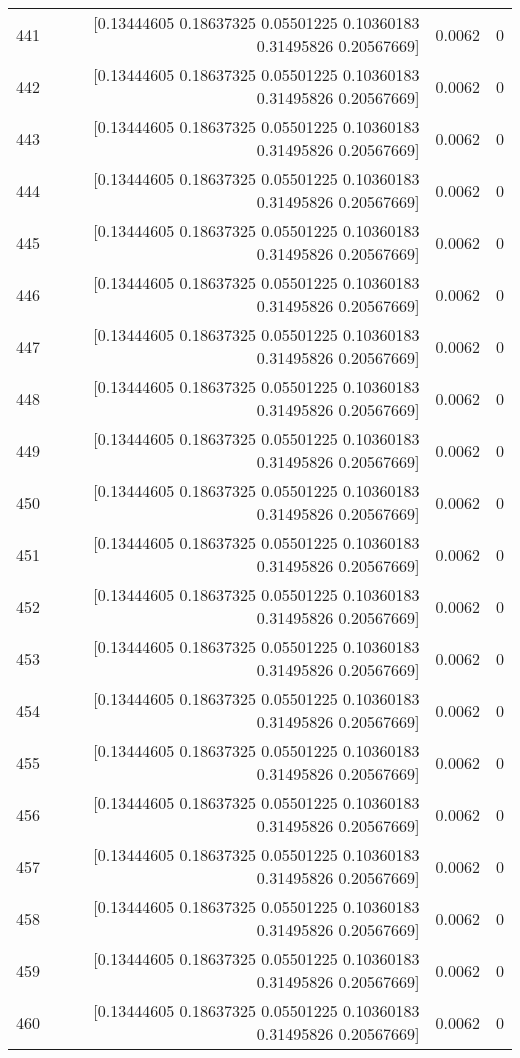 \begin{longtable}{lrrr}
441 & [0.13444605 0.18637325 0.05501225 0.10360183 0.31495826 0.20567669] & 0.0062 & 0 \\
442 & [0.13444605 0.18637325 0.05501225 0.10360183 0.31495826 0.20567669] & 0.0062 & 0 \\
443 & [0.13444605 0.18637325 0.05501225 0.10360183 0.31495826 0.20567669] & 0.0062 & 0 \\
444 & [0.13444605 0.18637325 0.05501225 0.10360183 0.31495826 0.20567669] & 0.0062 & 0 \\
445 & [0.13444605 0.18637325 0.05501225 0.10360183 0.31495826 0.20567669] & 0.0062 & 0 \\
446 & [0.13444605 0.18637325 0.05501225 0.10360183 0.31495826 0.20567669] & 0.0062 & 0 \\
447 & [0.13444605 0.18637325 0.05501225 0.10360183 0.31495826 0.20567669] & 0.0062 & 0 \\
448 & [0.13444605 0.18637325 0.05501225 0.10360183 0.31495826 0.20567669] & 0.0062 & 0 \\
449 & [0.13444605 0.18637325 0.05501225 0.10360183 0.31495826 0.20567669] & 0.0062 & 0 \\
450 & [0.13444605 0.18637325 0.05501225 0.10360183 0.31495826 0.20567669] & 0.0062 & 0 \\
451 & [0.13444605 0.18637325 0.05501225 0.10360183 0.31495826 0.20567669] & 0.0062 & 0 \\
452 & [0.13444605 0.18637325 0.05501225 0.10360183 0.31495826 0.20567669] & 0.0062 & 0 \\
453 & [0.13444605 0.18637325 0.05501225 0.10360183 0.31495826 0.20567669] & 0.0062 & 0 \\
454 & [0.13444605 0.18637325 0.05501225 0.10360183 0.31495826 0.20567669] & 0.0062 & 0 \\
455 & [0.13444605 0.18637325 0.05501225 0.10360183 0.31495826 0.20567669] & 0.0062 & 0 \\
456 & [0.13444605 0.18637325 0.05501225 0.10360183 0.31495826 0.20567669] & 0.0062 & 0 \\
457 & [0.13444605 0.18637325 0.05501225 0.10360183 0.31495826 0.20567669] & 0.0062 & 0 \\
458 & [0.13444605 0.18637325 0.05501225 0.10360183 0.31495826 0.20567669] & 0.0062 & 0 \\
459 & [0.13444605 0.18637325 0.05501225 0.10360183 0.31495826 0.20567669] & 0.0062 & 0 \\
460 & [0.13444605 0.18637325 0.05501225 0.10360183 0.31495826 0.20567669] & 0.0062 & 0 \\

\end{longtable}
